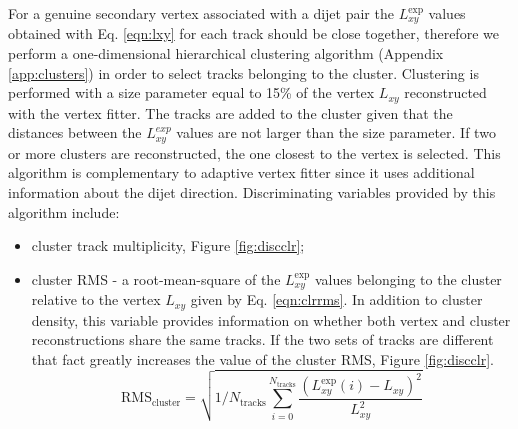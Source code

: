 \begin{enumerate}
For a genuine secondary vertex associated with a dijet pair the $L_{xy}^\text{exp}$ values obtained with Eq.
\ref{eqn:lxy} for each track should be close
 together, therefore we perform a one-dimensional hierarchical clustering algorithm (Appendix 
\ref{app:clusters})
in order to select tracks belonging to the cluster. 
Clustering is performed with a size parameter equal to 15\% of 
the vertex $L_{xy}$ reconstructed with the vertex fitter. 
The tracks are added to the cluster given that the distances between the $L_{xy}^{exp}$
values are not larger than the size parameter. 
 If two or more clusters 
are reconstructed, the one closest to the vertex is selected. 
This algorithm is complementary to adaptive vertex fitter
since it uses additional information about the dijet direction. Discriminating variables provided
 by this algorithm include:
\begin{itemize}
\item cluster track multiplicity, Figure \ref{fig:discclr};
\item cluster RMS - a root-mean-square of the $L_{xy}^\text{exp}$ values belonging to the cluster
 relative to the vertex $L_{xy}$ given by Eq. \ref{eqn:clrrms}. In addition to cluster density, this
variable provides information on whether both vertex and cluster reconstructions share the same tracks.
 If the two sets of tracks
are different that fact greatly increases the value of the cluster RMS, Figure \ref{fig:discclr}.
\begin{equation}
\text{RMS}_\text{cluster} = \sqrt{1/N_\text{tracks}\sum_{i=0}^{N_\text{tracks}}\frac{ \left(L_{xy}^\text{exp}(i) - L_{xy}\right)^2}{L_{xy}^2}}
\label{eqn:clrrms}
\end{equation}
\end{itemize}


\end{enumerate}
